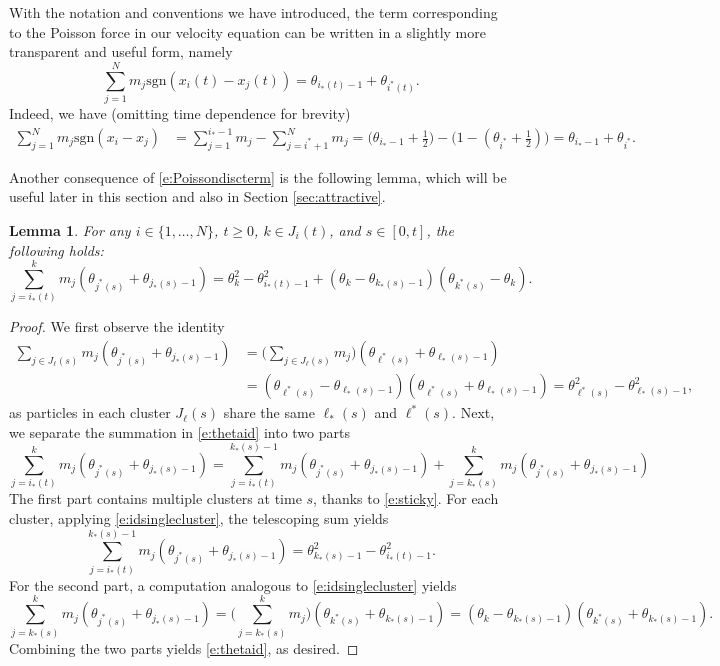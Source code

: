 \documentclass[10pt,a4paper]{amsart}
\newtheorem{lemma}[theorem]{Lemma}
\newcommand{\sgn}[1]{\mathrm{sgn}(#1)}
\begin{document}
	
	
	With the notation and conventions we have introduced, the term corresponding to the Poisson force in our velocity equation can be written in a slightly more transparent and useful form, namely 
	\begin{equation}
		\label{e:Poissondiscterm}
		\sum_{j=1}^N m_j \sgn{x_i(t)-x_j(t)}
		= \theta_{i_*(t)-1} + \theta_{i^*(t)}.
	\end{equation}
	Indeed, we have (omitting time dependence for brevity)
	\begin{align*}
		\sum_{j=1}^N m_j \sgn{x_i-x_j} & = \sum_{j=1}^{i_*-1}m_j - \sum_{j=i^*+1}^N m_j = \big(\theta_{i_*-1}+\tfrac12\big) - \big(1-(\theta_{i^*}+\tfrac12)\big)
		= \theta_{i_*-1} + \theta_{i^*}.
	\end{align*}
	
	
	Another consequence of \eqref{e:Poissondiscterm} is the following lemma, which will be useful later in this section and also in Section \ref{sec:attractive}.
	\begin{lemma}
		\label{l:thetaid}
		For any $i\in \{1, \ldots, N\}$, $t\ge 0$, $k\in J_i(t)$, and $s\in [0,t]$, the following holds:
		\begin{equation} 
			\label{e:thetaid}
			\sum_{j=i_*(t)}^k m_j (\theta_{j^*(s)} + \theta_{j_*(s) - 1}) = \theta_k^2 - \theta_{i_*(t)-1}^2 + (\theta_k - \theta_{k_*(s) - 1})(\theta_{k^*(s)} - \theta_k). 
		\end{equation} 
	\end{lemma}
	\begin{proof}
		We first observe the identity
		\begin{align}
			\sum_{j\in J_\ell(s)} m_j (\theta_{j^*(s)} + \theta_{j_*(s) - 1}) & = \Big(\sum_{j\in J_\ell(s)} m_j\Big) (\theta_{\ell^*(s)} + \theta_{\ell_*(s) - 1})\nonumber\\
			& = (\theta_{\ell^*(s)} - \theta_{\ell_*(s) - 1})(\theta_{\ell^*(s)} + \theta_{\ell_*(s) - 1}) = \theta_{\ell^*(s)}^2 - \theta_{\ell_*(s) - 1}^2,\label{e:idsinglecluster}
		\end{align}
		as particles in each cluster $J_\ell(s)$ share the same $\ell_*(s)$ and $\ell^*(s)$. Next, we separate the summation in \eqref{e:thetaid} into two parts
		\[
		\sum_{j=i_*(t)}^k m_j (\theta_{j^*(s)} + \theta_{j_*(s) - 1}) = \sum_{j=i_*(t)}^{k_*(s)-1} m_j (\theta_{j^*(s)} + \theta_{j_*(s) - 1}) + \sum_{j=k_*(s)}^k m_j (\theta_{j^*(s)} + \theta_{j_*(s) - 1})
		\]
		The first part contains multiple clusters at time $s$, thanks to \eqref{e:sticky}. For each cluster, applying \eqref{e:idsinglecluster}, the telescoping sum yields
		\[
		\sum_{j=i_*(t)}^{k_*(s)-1} m_j (\theta_{j^*(s)} + \theta_{j_*(s) - 1}) = \theta_{k_*(s)-1}^2 - \theta_{i_*(t)-1}^2.
		\]
		For the second part, a computation analogous to \eqref{e:idsinglecluster} yields
		\[
		\sum_{j=k_*(s)}^k m_j (\theta_{j^*(s)} + \theta_{j_*(s) - 1}) = \Big(\sum_{j=k_*(s)}^k m_j\Big) (\theta_{k^*(s)} + \theta_{k_*(s) - 1})
		= (\theta_{k} - \theta_{k_*(s) - 1})(\theta_{k^*(s)} + \theta_{k_*(s) - 1}).
		\]
		Combining the two parts yields \eqref{e:thetaid}, as desired.
	\end{proof}
\end{document}
